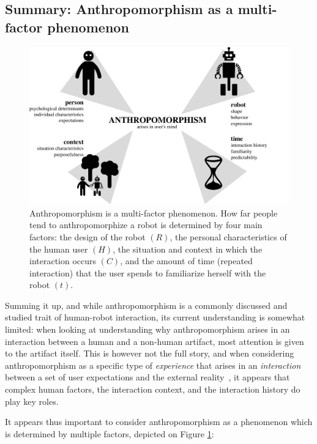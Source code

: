 \documentclass{frontiersSCNS} %
\begin{document}
\subsection{Summary: Anthropomorphism as a multi-factor phenomenon}
\label{sec:multi-factors}

\begin{figure}
    \centering
    \includegraphics[width=0.75\columnwidth]{anthropo.pdf}
    \caption{Anthropomorphism is a multi-factor phenomenon. How far people tend
    to anthropomorphize a robot is determined by four main factors: the design
    of the robot $(R)$, the personal characteristics of the human user $(H)$, the
    situation and context in which the interaction occurs $(C)$, and the amount of
    time (repeated interaction) that the user spends to familiarize herself with the
    robot $(t)$.}

    \label{fig:anthropofig}
\end{figure}


Summing it up, and while anthropomorphism is a commonly discussed and studied
trait of human-robot interaction, its current understanding is somewhat limited:
when looking at understanding why anthropomorphism arises in an interaction
between a human and a non-human artifact, most attention is given to the
artifact itself. This is however not the full story, and when considering
anthropomorphism as a specific type of \textit{experience} that arises in an
\textit{interaction} between a set of user expectations and the external
reality~\citep{persson_anthropomorphism_2000}, it appears that complex human
factors, the interaction context, and the interaction history do play key roles.

It appears thus important to consider anthropomorphism as a phenomenon which is
determined by multiple factors, depicted on Figure \ref{fig:anthropofig}:
\end{document}

